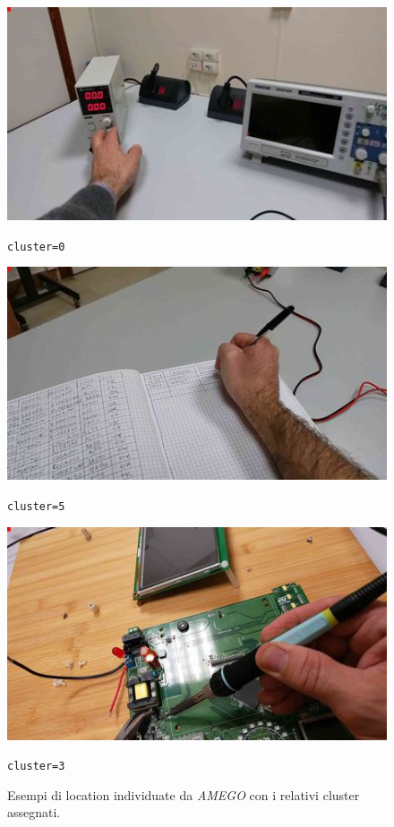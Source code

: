 \begin{figure}[ht]
    \centering
    \begin{minipage}{0.32\textwidth}
        \centering
        \includegraphics[width=\linewidth]{Images/amego_loc0.jpg}
        \caption*{\texttt{cluster=0}}
    \end{minipage}
    \begin{minipage}{0.32\textwidth}
        \centering
        \includegraphics[width=\linewidth]{Images/amego_loc1.jpg}
        \caption*{\texttt{cluster=5}}
    \end{minipage}
    \begin{minipage}{0.32\textwidth}
        \centering
        \includegraphics[width=\linewidth]{Images/amego_loc2.jpg}
        \caption*{\texttt{cluster=3}}
    \end{minipage}
    \caption{Esempi di location individuate da \emph{AMEGO} con i relativi cluster assegnati.}
    \label{fig:amego_locations}
\end{figure}


